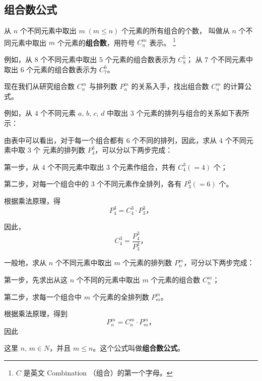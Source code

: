 \subsection{组合数公式}\label{subsec:2-5}

从 $n$ 个不同元素中取出 $m \; (m \leqslant n)$ 个元素的所有组合的个数，
叫做从 $n$ 个不同元素中取出 $m$ 个元素的\textbf{组合数}，用符号 $C_n^m$ 表示。
\footnote{$C$ 是英文 Combination （组合）的第一个字母。}

例如，从 $8$ 个不同元素中取出 $5$ 个元素的组合数表示为 $C_8^5$；
从 $7$ 个不同元素中取出 $6$ 个元素的组合数表示为 $C_7^6$。

现在我们从研究组合数 $C_n^m$ 与排列数 $P_n^m$ 的关系入手，找出组合数 $C_n^m$ 的计算公式。

例如，从 $4$ 个不同元素 $a,\, b,\, c,\, d$ 中取出 $3$ 个元素的排列与组合的关系如下表所示：

\begin{figure}[htbp]
    \centering
    
\end{figure}

由表中可以看出，对于每一个组合都有 $6$ 个不同的排列，因此，求从 $4$ 个不同元素中取 $3$ 个
元素的排列数 $P_4^3$，可以分以下两步完成：

第一步，从 $4$ 个不同元素中取出 $3$ 个元素作组合，共有 $C_4^3 (=4)$ 个；

第二步，对每一个组合中的 $3$ 个不同元素作全排列，各有 $P_3^3 (=6)$ 个。

根据乘法原理，得
$$ P_4^3 = C_4^3 \cdot P_3^3 \text{，}$$

因此，
$$ C_4^3 = \dfrac{P_4^3}{P_3^3} \text{，} $$

一般地，求从 $n$ 个不同元素中取出 $m$ 个元素的排列数 $P_n^m$，可分以下两步完成：

第一步，先求出从这 $n$ 个不同的元素中取出 $m$ 个元素的组合数 $C_n^m$；

第二步，求每一个组合中 $m$ 个元素的全排列数 $P_m^m$。

根据乘法原理，得到
$$ P_n^m = C_n^m \cdot P_m^m \text{，} $$
因此
\begin{center}
\end{center}
这里 $n,\, m \in N$，并且 $m \leqslant n$。这个公式叫做\textbf{组合数公式}。

